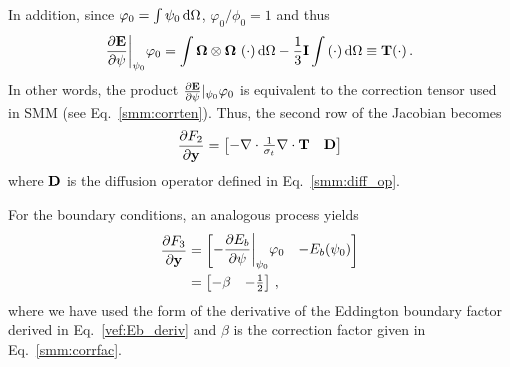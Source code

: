 \documentclass[../doc.tex]{subfiles}
\begin{document}
In addition, since $\varphi_0 = \int \psi_0 \mathop{}\!\mathrm{d} \Omega$, $\varphi_0/\phi_0 = 1$ and thus  
	\begin{equation}
		\frac{\partial \boldsymbol{\mathrm{E}}}{\partial \psi}\biggr\rvert_{\psi_0} \varphi_0 = \int \boldsymbol{\Omega}\otimes\boldsymbol{\Omega}\, \left( \cdot \right)\mathop{}\!\mathrm{d}\Omega  - \frac{1}{3}\boldsymbol{\mathrm{I}} \int \left( \cdot \right)\mathop{}\!\mathrm{d}\Omega \equiv \boldsymbol{\mathrm{T}}(\cdot) \,. 
	\end{equation}
In other words, the product $\frac{\partial \boldsymbol{\mathrm{E}}}{\partial \psi}|_{\psi_0}\varphi_0$ is equivalent to the correction tensor used in SMM (see Eq.~\ref{smm:corrten}). Thus, the second row of the Jacobian becomes
	\begin{equation}
		\frac{\partial F_2}{\partial \boldsymbol{\mathrm{y}}} = \begin{bmatrix} 
			-\nabla\cdot\frac{1}{\sigma_t}\nabla\cdot\boldsymbol{\mathrm{T}} & \boldsymbol{\mathrm{D}} 
		\end{bmatrix}
	\end{equation}
where $\boldsymbol{\mathrm{D}}$ is the diffusion operator defined in Eq.~\ref{smm:diff_op}. 

For the boundary conditions, an analogous process yields
	\begin{equation}
	\begin{aligned}
		\frac{\partial F_3}{\partial \boldsymbol{\mathrm{y}}} &= \begin{bmatrix} 
			\displaystyle-\frac{\partial E_b}{\partial \psi}\biggr\rvert_{\psi_0} \varphi_0 & -E_b(\psi_0) 
		\end{bmatrix} \\
		&= \begin{bmatrix} 
			-\beta & -\frac{1}{2} 
		\end{bmatrix} \,,
	\end{aligned}
	\end{equation}
where we have used the form of the derivative of the Eddington boundary factor derived in Eq.~\ref{vef:Eb_deriv} and $\beta$ is the correction factor given in Eq.~\ref{smm:corrfac}. 
\end{document}

